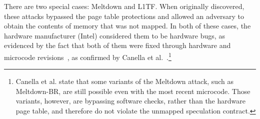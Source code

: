 There are two special cases:
Meltdown and L1TF.  When originally discovered, these attacks bypassed
the page table protections and allowed an adversary to obtain the
contents of memory that was not mapped.  In both of these cases, the
hardware manufacturer (Intel) considered them to be hardware bugs, as
evidenced by the fact that both of them were fixed through hardware and
microcode revisions~\cite{intel:meltdown, intel:l1tf}, as confirmed by
Canella et al.~\cite{sok:transient}.\footnote{Canella et al. state that
some variants of the Meltdown attack, such as Meltdown-BR, are still
possible even with the most recent microcode.  Those variants, however,
are bypassing software checks, rather than the hardware page table, and
therefore do not violate the unmapped speculation contract.}


